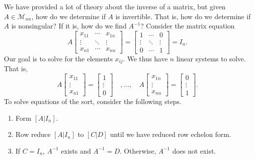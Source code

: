         We have provided a lot of theory about the inverse of a matrix, but given \(A\in\mathcal{M}_{nn}\), how do we determine if \(A\) is invertible. That is, how do we determine if \(A\) is nonsingular? If it is, how do we find \(A^{-1}\)? Consider the matrix equation
        \begin{equation*}
            A\begin{bmatrix}
                x_{11} & \cdots & x_{1n} \\
                \vdots & \ddots & \vdots \\
                x_{n1} & \cdots & x_{nn}
            \end{bmatrix}=
            \begin{bmatrix}
                1 & \cdots & 0 \\
                \vdots & \ddots & \vdots \\
                0 & \cdots & 1
            \end{bmatrix}=I_n.
        \end{equation*}
        Our goal is to solve for the elements \(x_{ij}\). We thus have \(n\) linear systems to solve. That is,
        \begin{equation*}
            A\begin{bmatrix} x_{11} \\ \vdots \\ x_{n1} \end{bmatrix} = \begin{bmatrix} 1 \\ \vdots \\ 0 \end{bmatrix}\quad,\ldots,\quad A\begin{bmatrix} x_{1n} \\ \vdots \\ x_{nn} \end{bmatrix} = \begin{bmatrix} 0 \\ \vdots \\ 1 \end{bmatrix}.
        \end{equation*}
        To solve equations of the sort, consider the following steps.
        \begin{enumerate}
            \item Form \([A|I_n]\).
            \item Row reduce \([A|I_n]\) to \([C|D]\) until we have reduced row echelon form.
            \item If \(C=I_n\), \(A^{-1}\) exists and \(A^{-1}=D\). Otherwise, \(A^{-1}\) does not exist.
        \end{enumerate}
